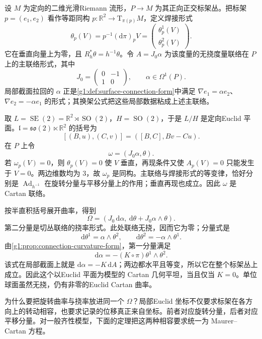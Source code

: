 \begin{example}\label{g1:exm:cartan-euclidean-surface}
	设 \(M\) 为定向的二维光滑Riemann 流形，\(P\to M\) 为其正向正交标架丛。把标架 \(p=(e_1,e_2)\) 看作等距同构 \(p:\mathbb R^2\to\mathrm{T}_{\pi(p)}M\)，定义焊接形式
	\[
		\theta_p(V)=p^{-1}(\mathrm{d}\pi)_pV
		=\begin{pmatrix}\theta^1_p(V)\\\theta^2_p(V)\end{pmatrix}.
	\]
	它在垂直向量上为零，且 \(R_h^*\theta=h^{-1}\theta\)。令 \(A=J_0\alpha\) 为该度量的无挠度量联络在 \(P\) 上的主联络形式，其中
	\[
		J_0=\begin{pmatrix}0&-1\\1&0\end{pmatrix},
		\qquad
		\alpha\in\Omega^1(P).
	\]
	局部截面拉回的 \(\alpha\) 正是\cref{g1:def:surface-connection-form}中满足 \(\nabla e_1=\alpha e_2\)、\(\nabla e_2=-\alpha e_1\) 的形式；其换架公式把这些局部数据粘成上述主联络。

	取 \(L=\operatorname{SE}(2)=\mathbb R^2\rtimes\operatorname{SO}(2)\)，\(H=\operatorname{SO}(2)\)，于是 \(L/H\) 是定向Euclid 平面。\(\mathfrak l=\mathfrak{so}(2)\ltimes\mathbb R^2\) 的括号为
	\[
		[(B,u),(C,v)]=([B,C],Bv-Cu).
	\]
	在 \(P\) 上令
	\[
		\omega=(J_0\alpha,\theta).
	\]
	若 \(\omega_p(V)=0\)，则 \(\theta_p(V)=0\) 使 \(V\) 垂直，再现条件又使 \(A_p(V)=0\) 只能发生于 \(V=0\)。两边维数均为 \(3\)，故 \(\omega_p\) 是同构。主联络与焊接形式的等变律，恰好分别是 \(\operatorname{Ad}_{h^{-1}}\) 在旋转分量与平移分量上的作用；垂直再现也成立。因此 \(\omega\) 是 Cartan 联络。

	按半直积括号展开曲率，得到
	\begin{equation}\label{g1:eq:cartan-surface-curvature}
		\Omega=
		\left(
		J_0\,\mathrm{d}\alpha,\ 
		\mathrm{d}\theta+J_0\alpha\wedge\theta
		\right).
	\end{equation}
	第二分量是切丛联络的挠率形式。此处联络无挠，因而它为零；分量式是
	\[
		\mathrm{d}\theta^1=\alpha\wedge\theta^2,\qquad
		\mathrm{d}\theta^2=-\alpha\wedge\theta^1.
	\]
	由\cref{g1:prop:connection-curvature-form}，第一分量满足
	\[
		\mathrm{d}\alpha=-(K\circ\pi)\theta^1\wedge\theta^2.
	\]
	该式在局部截面上就是 \(\mathrm{d}\alpha=-K\,\mathrm{d}A\)；两边都水平且等变，所以它在整个标架丛上成立。因此这个以Euclid 平面为模型的 Cartan 几何平坦，当且仅当 \(K=0\)。单位球面虽然无挠，仍有非零的Euclid  Cartan 曲率。
\end{example}

为什么要把旋转曲率与挠率放进同一个 \(\Omega\)？局部Euclid 坐标不仅要求标架在各方向上的转动相容，也要求记录的位移真正来自坐标。前者对应旋转分量，后者对应平移分量。对一般齐性模型，下面的定理把这两种相容要求统一为 Maurer--Cartan 方程。

